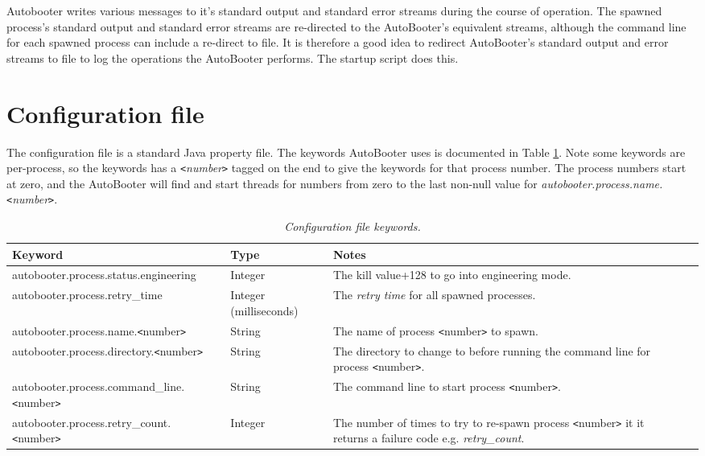 \documentclass[10pt,a4paper]{article}
\begin{document}
Autobooter writes various messages to it's standard output and standard error streams during the course of operation.
The spawned process's standard output and standard error streams are re-directed to the AutoBooter's equivalent
streams, although the command line for each spawned process can include a re-direct to file. 
It is therefore a good idea to redirect AutoBooter's standard output and error streams to file
to log the operations the AutoBooter performs. The startup script does this.

\section{Configuration file}
The configuration file is a standard Java property file. The keywords AutoBooter uses is documented in
Table \ref{tab:configkeyword}. Note some keywords are per-process, so the keywords has a 
{\em \verb'<'number\verb'>'} tagged
on the end to give the keywords for that process number. The process numbers start at zero, and the 
AutoBooter will find and start threads for numbers from zero to the last non-null value for
{\em autobooter.process.name.\verb'<'number\verb'>'}.

\begin{table}
\begin{center}
\begin{tabular}{|l|l|p{12em}|l|p{17em}|}
\hline
{\bf Keyword} & {\bf Type} & {\bf Notes} \\ \hline
autobooter.process.status.engineering   & Integer & The kill value+128 to go into engineering mode.\\ \hline
autobooter.process.retry\_time		& Integer (milliseconds) & The {\em retry time} for all spawned processes.\\ \hline
autobooter.process.name.\verb'<'number\verb'>'	& String & The name of process \verb'<'number\verb'>' to spawn.\\ \hline
autobooter.process.directory.\verb'<'number\verb'>'	& String & The directory to change to before running the command line for process \verb'<'number\verb'>'.\\ \hline
autobooter.process.command\_line.\verb'<'number\verb'>'& String & The command line to start process \verb'<'number\verb'>'.\\ \hline
autobooter.process.retry\_count.\verb'<'number\verb'>'& Integer & The number of times to try to re-spawn process \verb'<'number\verb'>' it it returns a failure code e.g. {\em retry\_count}.\\ \hline
\end{tabular}
\end{center}
\caption{\em Configuration file keywords.}
\label{tab:configkeyword} 
\end{table}
\end{document}
